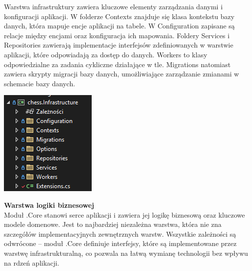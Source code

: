 \documentclass[12pt,a4paper]{article}
\begin{document}
\vspace{0.5cm}
\begin{minipage}[t]{0.45\textwidth}
    \vspace{0pt}
    \raggedright
    Warstwa infrastruktury zawiera kluczowe elementy zarządzania danymi i konfiguracji aplikacji. W folderze Contexts znajduje się klasa kontekstu bazy danych, która mapuje encje aplikacji na tabele. W Configuration zapisane są relacje między encjami oraz konfiguracja ich mapowania. Foldery Services i Repositories zawierają implementacje interfejsów zdefiniowanych w warstwie aplikacji, które odpowiadają za dostęp do danych. Workers to klasy odpowiedzialne za zadania cykliczne działające w tle. Migrations natomiast zawiera skrypty migracji bazy danych, umożliwiające zarządzanie zmianami w schemacie bazy danych.
\end{minipage}
\hfill
\begin{minipage}[t]{0.45\textwidth}
    \vspace{0pt}
    \centering
    \includegraphics[width=\linewidth]{zdj/struktura_back_infrastructure.png} 
\end{minipage}
\vspace{0.5cm}

\textbf{Warstwa logiki biznesowej}\\
Moduł .Core stanowi serce aplikacji i zawiera jej logikę biznesową oraz kluczowe modele domenowe. Jest to najbardziej niezależna warstwa, która nie zna szczegółów implementacyjnych zewnętrznych warstw. Wszystkie zależności są odwrócone – moduł .Core definiuje interfejsy, które są implementowane przez warstwę infrastrukturalną, co pozwala na łatwą wymianę technologii bez wpływu na rdzeń aplikacji.
\end{document}
